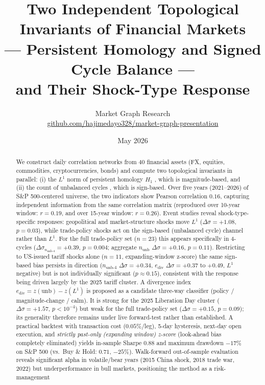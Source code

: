 \documentclass[11pt]{article}
\title{Two Independent Topological Invariants of Financial Markets \\
       --- Persistent Homology and Signed Cycle Balance --- \\
       and Their Shock-Type Response}
\author{Market Graph Research\\
        \small{\href{https://github.com/hajimedayo328/market-graph-presentation}{github.com/hajimedayo328/market-graph-presentation}}}
\date{May 2026}
\begin{document}
\maketitle

\begin{abstract}
We construct daily correlation networks from 40 financial assets (FX, equities,
commodities, cryptocurrencies, bonds) and compute two topological invariants
in parallel: (i) the $L^1$ norm of persistent homology $H_1$
\cite{gidea2017topological}, which is magnitude-based, and (ii) the count of
unbalanced cycles \cite{heider1946attitudes,cartwright1956structural}, which is
sign-based. Over five years (2021--2026) of S\&P 500-centered universe, the two
indicators show Pearson correlation $0.16$, capturing independent information
from the same correlation matrix (reproduced over 10-year window: $r = 0.19$, and
over 15-year window: $r = 0.26$). Event studies reveal shock-type-specific
responses: geopolitical and market-structure shocks move $L^1$ ($\Delta\sigma = +1.08$,
$p = 0.03$), while trade-policy shocks act on the sign-based (unbalanced cycle)
channel rather than $L^1$. For the full trade-policy set ($n = 23$) this appears
specifically in 4-cycles ($\Delta\sigma_{n_{\mathrm{unb}\text{-}4}} = +0.39$,
$p = 0.004$; aggregate $n_{\mathrm{unb}}$ $\Delta\sigma = +0.16$, $p = 0.11$).
Restricting to US-issued tariff shocks alone ($n = 11$, expanding-window z-score)
the same sign-based bias persists in direction ($n_{\mathrm{unb}\text{-}4}$
$\Delta\sigma = +0.34$, $e_{\mathrm{div}}$ $\Delta\sigma = +0.37$ to $+0.49$,
$L^1$ negative) but is not individually significant ($p \approx 0.15$),
consistent with the response being driven largely by the 2025 tariff cluster.
A divergence index
$e_{\mathrm{div}} = z(\text{unb}) - z(L^1)$ is proposed as a candidate three-way
classifier (policy / magnitude-change / calm). It is strong for the 2025 Liberation
Day cluster ($\Delta\sigma = +1.57$, $p < 10^{-4}$) but weak for the full
trade-policy set ($\Delta\sigma = +0.15$, $p = 0.09$); its generality therefore
remains under live forward-test rather than established.
A practical backtest with transaction cost ($0.05\%$/leg), 5-day hysteresis,
next-day open execution, and \emph{strictly past-only (expanding window)
z-score} (look-ahead bias completely eliminated) yields in-sample Sharpe $0.88$
and maximum drawdown $-17\%$ on S\&P 500 (vs.\ Buy \& Hold: $0.71$, $-25\%$).
Walk-forward out-of-sample evaluation reveals significant alpha in
volatile/bear years (2015 China shock, 2018 trade war, 2022) but
underperformance in bull markets, positioning the method as a risk-management

\end{abstract}
\end{document}
